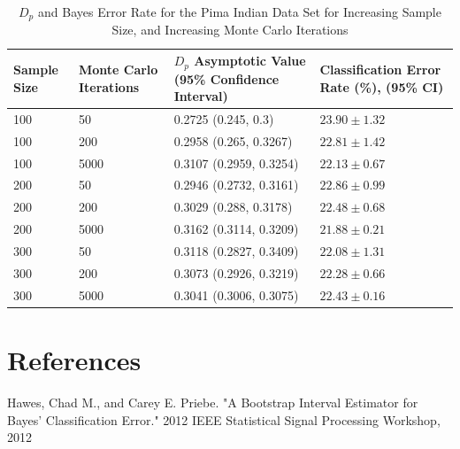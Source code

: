 \documentclass{article}
\begin{document}
	\newpage
	\begin{table}[!h]		
		\caption{$D_p$ and Bayes Error Rate for the Pima Indian Data Set for Increasing Sample Size, and Increasing Monte Carlo Iterations}
		\begin{center}
			\begin{tabular}[!h]{ |p{2cm}||p{2cm}|p{5cm}|p{4cm}|  }
				
				\hline
				Sample Size & Monte Carlo Iterations & $D_p$ Asymptotic Value (95\% Confidence Interval)& Classification Error Rate (\%), (95\% CI) \\ [0.5ex] 
				\hline\hline
				100	& 50	& 0.2725   (0.245, 0.3)	& $23.90  \pm 1.32$\\
				
				\hline
				
				100	& 200	& 0.2958  (0.265, 0.3267)	& $22.81  \pm 1.42$\\
				\hline
				
				100	& 5000	& 0.3107  (0.2959, 0.3254)	& $22.13  \pm 0.67$\\
				
				\hline
				200	& 50	& 0.2946  (0.2732, 0.3161)	& $22.86  \pm 0.99$\\
				
				\hline 
				200	& 200	& 0.3029  (0.288, 0.3178)	& $22.48  \pm 0.68$\\
				
				\hline
				200	& 5000  & 0.3162  (0.3114, 0.3209)	& $21.88  \pm 0.21$\\
				
				\hline
				300	& 50	& 0.3118  (0.2827, 0.3409)  & $22.08  \pm 1.31$\\
				\hline
				300	& 200	& 0.3073  (0.2926, 0.3219)	& $22.28  \pm 0.66$\\
				\hline
				300	& 5000	& 0.3041  (0.3006, 0.3075)	& $22.43  \pm 0.16$\\ 
				\hline 		
			\end{tabular}
		\end{center}
	\end{table}			
	
	\newpage
	\section*{References}
	\noindent [1] Hawes, Chad M., and Carey E. Priebe. "A Bootstrap Interval Estimator for Bayes' Classification 
	\indent Error." 2012 IEEE Statistical Signal Processing Workshop, 2012
	\\ [0.5ex]
	
\end{document}
